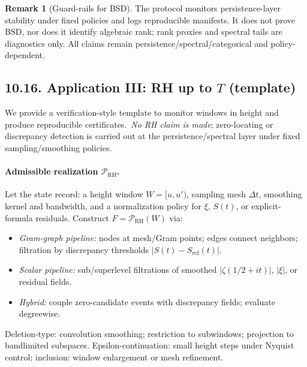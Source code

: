 \documentclass[11pt]{article}
\numberwithin{equation}{section}
\theoremstyle{plain}
\theoremstyle{definition}
\theoremstyle{remark}
\DeclareRobustCommand{\hyp}{\nobreakdash-}
\theoremstyle{plain}
\theoremstyle{definition}
\numberwithin{equation}{section}
\theoremstyle{definition}
\newtheorem{remark}[theorem]{Remark}
\numberwithin{equation}{section}
\theoremstyle{plain}
\theoremstyle{definition}
\theoremstyle{remark}
\begin{document}
\begin{remark}[Guard\hyp rails for BSD]
The protocol monitors persistence\hyp layer stability under fixed policies and logs reproducible manifests. It does not prove BSD, nor does it identify algebraic rank; rank proxies and spectral tails are diagnostics only. All claims remain persistence/spectral/categorical and policy\hyp dependent.
\end{remark}


\subsection*{10.16. Application III: RH up to \texorpdfstring{$T$}{T} (template)}
We provide a verification\hyp style template to monitor windows in height and produce reproducible certificates.\ \emph{No RH claim is made}; zero\hyp locating or discrepancy detection is carried out at the persistence/spectral layer under fixed sampling/smoothing policies.

\paragraph{Admissible realization \(\mathcal{P}_{\mathrm{RH}}\).}
Let the state record: a height window \(W=[u,u')\), sampling mesh \(\Delta t\), smoothing kernel and bandwidth, and a normalization policy for \(\xi\), \(S(t)\), or explicit\hyp formula residuals. Construct \(F=\mathcal{P}_{\mathrm{RH}}(W)\) via:
\begin{itemize}
  \item \emph{Gram\hyp graph pipeline:} nodes at mesh/Gram points; edges connect neighbors; filtration by discrepancy thresholds \(|S(t)-S_{\mathrm{ref}}(t)|\).
  \item \emph{Scalar pipeline:} sub/superlevel filtrations of smoothed \(|\zeta(1/2+it)|\), \(|\xi|\), or residual fields.
  \item \emph{Hybrid:} couple zero\hyp candidate events with discrepancy fields; evaluate degreewise.
\end{itemize}
Deletion\hyp type: convolution smoothing; restriction to subwindows; projection to bandlimited subspaces. Epsilon\hyp continuation: small height steps under Nyquist control; inclusion: window enlargement or mesh refinement.
\end{document}

